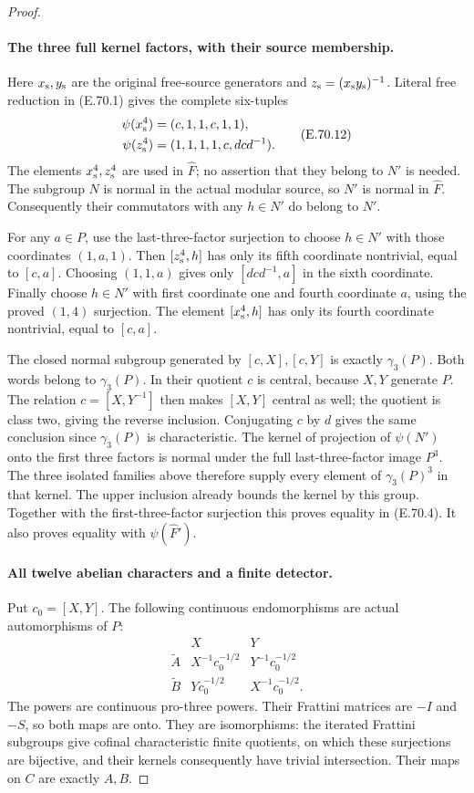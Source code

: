 \begin{proof}
\paragraph{The three full kernel factors, with their source membership.}
Here $x_{\rm s},y_{\rm s}$ are the original free-source
generators and $z_{\rm s}=(x_{\rm s}y_{\rm s})^{-1}$.
Literal free reduction in (E.70.1) gives the complete
six-tuples
\[
 \begin{split}
 \psi(x_{\rm s}^{4})&=(c,1,1,c,1,1),\\
 \psi(z_{\rm s}^{4})&=(1,1,1,1,c,dcd^{-1}).
 \end{split}
 \tag{E.70.12}
\]
The elements $x_{\rm s}^4,z_{\rm s}^4$ are used in
$\widehat F$; no assertion that they belong to $N'$
is needed. The subgroup $N$ is normal in the actual
modular source, so $N'$ is normal in $\widehat F$.
Consequently their commutators with any $h\in N'$
do belong to $N'$.

For any $a\in P$, use the last-three-factor
surjection to choose $h\in N'$ with those coordinates
$(1,a,1)$. Then $[z_{\rm s}^4,h]$ has only its fifth
coordinate nontrivial, equal to $[c,a]$. Choosing
$(1,1,a)$ gives only $[dcd^{-1},a]$ in the sixth
coordinate. Finally choose $h\in N'$ with first
coordinate one and fourth coordinate $a$, using
the proved $(1,4)$ surjection. The element
$[x_{\rm s}^4,h]$ has only its fourth coordinate
nontrivial, equal to $[c,a]$.

The closed normal subgroup generated by
$[c,X],[c,Y]$ is exactly $\gamma_3(P)$. Both words
belong to $\gamma_3(P)$. In their quotient $c$ is
central, because $X,Y$ generate $P$. The relation
$c=[X,Y^{-1}]$ then makes $[X,Y]$ central as well;
the quotient is class two, giving the reverse
inclusion. Conjugating $c$ by $d$ gives the same
conclusion since $\gamma_3(P)$ is characteristic.
The kernel of projection of $\psi(N')$ onto the
first three factors is normal under the full
last-three-factor image $P^3$. The three isolated
families above therefore supply every element of
$\gamma_3(P)^3$ in that kernel. The upper inclusion
already bounds the kernel by this group. Together
with the first-three-factor surjection this proves
equality in (E.70.4). It also proves equality with
$\psi(\widehat F')$.

\paragraph{All twelve abelian characters and a finite detector.}
Put $c_0=[X,Y]$. The following continuous
endomorphisms are actual automorphisms of $P$:
\[
 \begin{array}{c|cc}
       &X&Y\\ \hline
 \widetilde A&X^{-1}c_0^{-1/2}&Y^{-1}c_0^{-1/2}\\
 \widetilde B&Yc_0^{-1/2}&X^{-1}c_0^{-1/2}.
 \end{array}
 \tag{E.70.13}
\]
The powers are continuous pro-three powers. Their
Frattini matrices are $-I$ and $-S$, so both maps
are onto. They are isomorphisms: the iterated
Frattini subgroups give cofinal characteristic
finite quotients, on which these surjections are
bijective, and their kernels consequently have
trivial intersection. Their maps on $C$ are
exactly $A,B$.


\end{proof}
